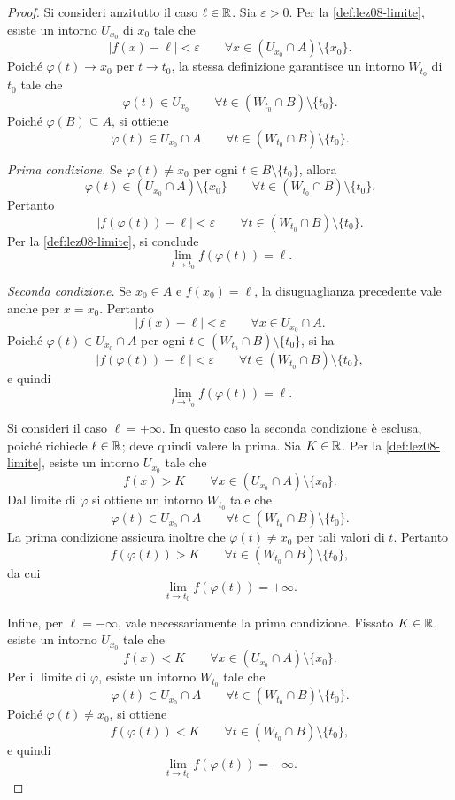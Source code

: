 \begin{proof}
Si consideri anzitutto il caso \(\ell\in\mathbb{R}\).
Sia \(\varepsilon>0\). Per la \cref{def:lez08-limite},
esiste un intorno \(U_{x_0}\) di \(x_0\) tale che
\[
  |f(x)-\ell|<\varepsilon
  \qquad\forall x\in(U_{x_0}\cap A)\setminus\{x_0\}.
\]
Poiché \(\varphi(t)\to x_0\) per \(t\to t_0\),
la stessa definizione garantisce un intorno \(W_{t_0}\)
di \(t_0\) tale che
\[
  \varphi(t)\in U_{x_0}
  \qquad\forall t\in(W_{t_0}\cap B)\setminus\{t_0\}.
\]
Poiché \(\varphi(B)\subseteq A\), si ottiene
\[
  \varphi(t)\in U_{x_0}\cap A
  \qquad\forall t\in(W_{t_0}\cap B)\setminus\{t_0\}.
\]

\emph{Prima condizione.}
Se \(\varphi(t)\ne x_0\) per ogni
\(t\in B\setminus\{t_0\}\), allora
\[
  \varphi(t)\in(U_{x_0}\cap A)\setminus\{x_0\}
  \qquad\forall t\in(W_{t_0}\cap B)\setminus\{t_0\}.
\]
Pertanto
\[
  |f(\varphi(t))-\ell|<\varepsilon
  \qquad\forall t\in(W_{t_0}\cap B)\setminus\{t_0\}.
\]
Per la \cref{def:lez08-limite}, si conclude
\[
  \lim_{t\to t_0}f(\varphi(t))=\ell.
\]

\emph{Seconda condizione.}
Se \(x_0\in A\) e \(f(x_0)=\ell\), la disuguaglianza
precedente vale anche per \(x=x_0\). Pertanto
\[
  |f(x)-\ell|<\varepsilon
  \qquad\forall x\in U_{x_0}\cap A.
\]
Poiché \(\varphi(t)\in U_{x_0}\cap A\) per ogni
\(t\in(W_{t_0}\cap B)\setminus\{t_0\}\), si ha
\[
  |f(\varphi(t))-\ell|<\varepsilon
  \qquad\forall t\in(W_{t_0}\cap B)\setminus\{t_0\},
\]
e quindi
\[
  \lim_{t\to t_0}f(\varphi(t))=\ell.
\]

Si consideri il caso \(\ell=+\infty\). In questo caso
la seconda condizione è esclusa, poiché richiede
\(\ell\in\mathbb{R}\); deve quindi valere la prima.
Sia \(K\in\mathbb{R}\). Per la \cref{def:lez08-limite},
esiste un intorno \(U_{x_0}\) tale che
\[
  f(x)>K
  \qquad\forall x\in(U_{x_0}\cap A)\setminus\{x_0\}.
\]
Dal limite di \(\varphi\) si ottiene un intorno
\(W_{t_0}\) tale che
\[
  \varphi(t)\in U_{x_0}\cap A
  \qquad\forall t\in(W_{t_0}\cap B)\setminus\{t_0\}.
\]
La prima condizione assicura inoltre che
\(\varphi(t)\ne x_0\) per tali valori di \(t\).
Pertanto
\[
  f(\varphi(t))>K
  \qquad\forall t\in(W_{t_0}\cap B)\setminus\{t_0\},
\]
da cui
\[
  \lim_{t\to t_0}f(\varphi(t))=+\infty.
\]

Infine, per \(\ell=-\infty\), vale necessariamente
la prima condizione. Fissato \(K\in\mathbb{R}\), esiste
un intorno \(U_{x_0}\) tale che
\[
  f(x)<K
  \qquad\forall x\in(U_{x_0}\cap A)\setminus\{x_0\}.
\]
Per il limite di \(\varphi\), esiste un intorno
\(W_{t_0}\) tale che
\[
  \varphi(t)\in U_{x_0}\cap A
  \qquad\forall t\in(W_{t_0}\cap B)\setminus\{t_0\}.
\]
Poiché \(\varphi(t)\ne x_0\), si ottiene
\[
  f(\varphi(t))<K
  \qquad\forall t\in(W_{t_0}\cap B)\setminus\{t_0\},
\]
e quindi
\[
  \lim_{t\to t_0}f(\varphi(t))=-\infty.
\]
\end{proof}

